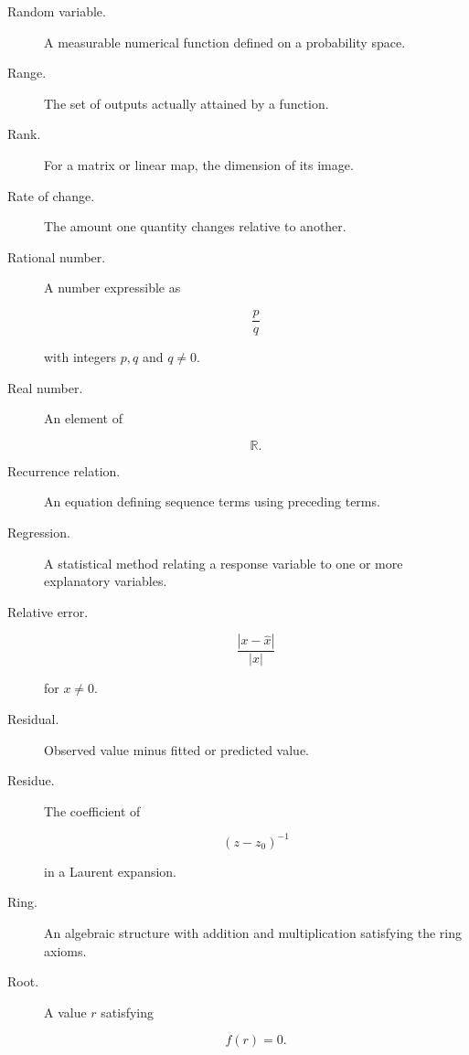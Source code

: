 \begin{description}

\item[Random variable.]
A measurable numerical function defined on a probability space.

\item[Range.]
The set of outputs actually attained by a function.

\item[Rank.]
For a matrix or linear map, the dimension of its image.

\item[Rate of change.]
The amount one quantity changes relative to another.

\item[Rational number.]
A number expressible as

\[
\frac pq
\]

with integers \(p,q\) and \(q\neq0\).

\item[Real number.]
An element of

\[
\mathbb{R}.
\]

\item[Recurrence relation.]
An equation defining sequence terms using preceding terms.

\item[Regression.]
A statistical method relating a response variable to one or more explanatory
variables.

\item[Relative error.]

\[
\frac{
|x-\hat{x}|
}{
|x|
}
\]

for \(x\neq0\).

\item[Residual.]
Observed value minus fitted or predicted value.

\item[Residue.]
The coefficient of

\[
(z-z_0)^{-1}
\]

in a Laurent expansion.

\item[Ring.]
An algebraic structure with addition and multiplication satisfying the ring
axioms.

\item[Root.]
A value \(r\) satisfying

\[
f(r)=0.
\]

\end{description}

